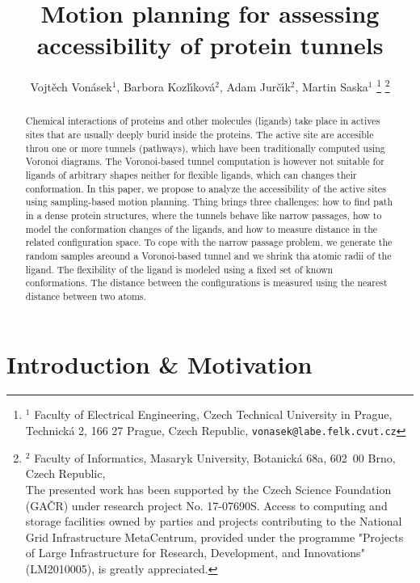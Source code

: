 \documentclass[letterpaper, 10 pt, conference]{ieeeconf} %
\title{Motion planning for assessing accessibility of protein tunnels}
\author{Vojt\v ech Von\' asek$^{1}$,
    Barbora Kozl\'\i kov\'a$^{2}$,
    Adam Jur\v{c}\'\i k$^{2}$,
    Martin Saska$^{1}$
\thanks{$^{1}$ Faculty of Electrical Engineering,  Czech Technical University in Prague, 
Technick\'a 2, 166 27 Prague, Czech Republic,
{\tt vonasek@labe.felk.cvut.cz}}
\thanks{$^{2}$        
Faculty of Informatics,   Masaryk University, 
Botanick\'a 68a, 602~00 Brno, Czech Republic,\\
The presented work has been supported by the Czech Science Foundation (GA{\v C}R) under research project No. 17-07690S.
Access to computing and storage facilities owned by parties and projects contributing to the National Grid Infrastructure MetaCentrum, provided under the programme "Projects of Large Infrastructure for Research, Development, and Innovations" (LM2010005), is greatly appreciated.}}
\begin{document}
\maketitle
\thispagestyle{empty}
\pagestyle{empty}



\begin{abstract}
Chemical interactions of proteins and other molecules (ligands) take place in actives sites that are usually deeply burid inside the proteins.
The active site are accesible throu one or more tunnels (pathways), which have been traditionally computed using Voronoi diagrams.
The Voronoi-based tunnel computation is however not suitable for ligands of arbitrary shapes neither for flexible
ligands, which can changes their conformation.
In this paper, we propose to analyze the accessibility of the active sites using sampling-based motion planning.
Thing brings three challenges: how to find path in a dense protein structures, where the tunnels behave like narrow passages,
how to model the conformation changes of the ligands, and how to measure distance in the related configuration space.
To cope with the narrow passage problem, we generate the random samples areound a Voronoi-based tunnel and we shrink
tha atomic radii of the ligand.
The flexibility of the ligand is modeled using a fixed set of known conformations.
The distance between the configurations is measured using the nearest distance between two atoms.
\end{abstract}


\section{Introduction \& Motivation}
\end{document}
